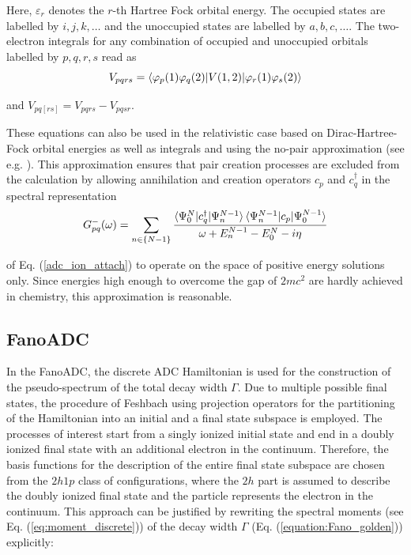 Here, $\varepsilon_r$ denotes the $r$-th Hartree Fock orbital energy.
The occupied states are labelled
by $i,j,k,\dots$ and the unoccupied states are labelled by $a,b,c,\dots$. The
two-electron integrals for any combination of occupied and unoccupied orbitals
labelled by $p,q,r,s$ read as
\begin{equation}
 V_{pqrs} = \braket{\varphi_p(1)\varphi_q(2) |V(1,2)| \varphi_r(1)\varphi_s(2)}
\end{equation}

and $V_{pq[rs]} = V_{pqrs} - V_{pqsr}$.


These equations can also be used in the relativistic case based on
Dirac-Hartree-Fock orbital energies as well as integrals
\cite{Pernpointner04_1,Pernpointner04_2}  and using the
no-pair approximation (see e.g. \cite{ReiherWolf09}). This
approximation ensures that pair creation processes are excluded from
the calculation by allowing annihilation and creation operators
$c_p$ and $c_q^\dagger$ in the
spectral representation
\begin{equation}
 G^-_{pq}(\omega) = \sum\limits_{n\in \{N-1 \}}
                    \frac{\braket{\Psi_0^N| c_q^\dagger | \Psi_n^{N-1}}
                          \braket{\Psi_n^{N-1}| c_p |\Psi_0^{N-1}}}
                    {\omega + E_n^{N-1} - E_0^N -i\eta}
\end{equation}

of Eq. (\ref{adc_ion_attach})
to operate on the space of positive energy solutions only. Since energies
high enough to overcome the gap of $2mc^2$ are hardly achieved in chemistry,
this approximation is reasonable.




\subsection{FanoADC}
In the FanoADC, the discrete ADC Hamiltonian
is used for the construction of the pseudo-spectrum of the total decay width
$\Gamma$.
Due to multiple possible final states, the procedure
of Feshbach \cite{Feshbach62}
using projection operators for the partitioning of the Hamiltonian
into an initial and a final state subspace is employed.
The processes of interest start from a singly ionized initial state and end in
a doubly ionized final state with an addi\-tio\-nal electron
in the continuum.
Therefore, the basis functions for the description of the entire final
state subspace are chosen from
the $2h1p$ class of configurations, where the $2h$ part is assumed to
describe the doubly ionized final state and the
particle represents the electron in the continuum. This approach can be justified
by rewriting the spectral moments (see Eq. (\ref{eq:moment_discrete}))
of the decay width $\Gamma$
(Eq. (\ref{equation:Fano_golden})) explicitly:

